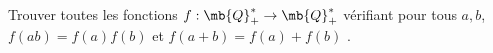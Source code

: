 \exercice

Trouver toutes les fonctions $f : \mb{Q}_{+}^* \rightarrow \mb{Q}_{+}^*$ vérifiant pour tous $a,b$, $f(ab) = f(a)f(b)$ et $f(a+b) = f(a)+f(b)$ .



